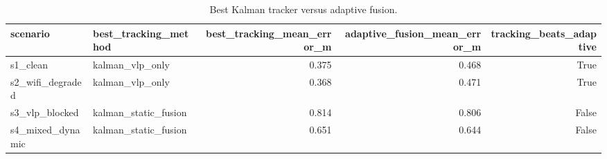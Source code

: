 \begin{table}[t]
\centering
\caption{Best Kalman tracker versus adaptive fusion.}
\label{tab:tracking_vs_adaptive}
\begin{tabular}{llrrr}
\toprule
scenario & best_tracking_method & best_tracking_mean_error_m & adaptive_fusion_mean_error_m & tracking_beats_adaptive \\
\midrule
s1_clean & kalman_vlp_only & 0.375 & 0.468 & True \\
s2_wifi_degraded & kalman_vlp_only & 0.368 & 0.471 & True \\
s3_vlp_blocked & kalman_static_fusion & 0.814 & 0.806 & False \\
s4_mixed_dynamic & kalman_static_fusion & 0.651 & 0.644 & False \\
\bottomrule
\end{tabular}
\end{table}
